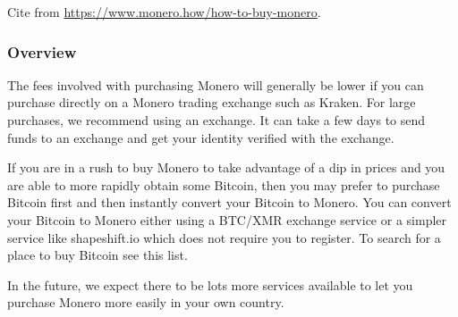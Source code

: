 	Cite from \url{https://www.monero.how/how-to-buy-monero}.
\subsubsection{Overview}
	The fees involved with purchasing Monero will generally be lower if you can purchase directly on a Monero trading exchange such as Kraken. For large purchases, we recommend using an exchange. It can take a few days to send funds to an exchange and get your identity verified with the exchange. \par
	If you are in a rush to buy Monero to take advantage of a dip in prices and you are able to more rapidly obtain some Bitcoin, then you may prefer to purchase Bitcoin first and then instantly convert your Bitcoin to Monero. You can convert your Bitcoin to Monero either using a BTC/XMR exchange service or a simpler service like shapeshift.io which does not require you to register. To search for a place to buy Bitcoin see this list. \par
	In the future, we expect there to be lots more services available to let you purchase Monero more easily in your own country.\par
